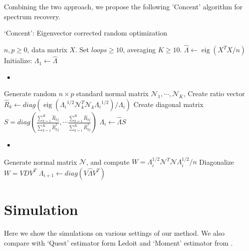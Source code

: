 \documentclass[12pt]{extarticle}
\newcommand{\cN}{{\mathcal{N}}}
\newcommand{\1}{\field{1}}
\DeclareMathOperator*{\eig}{eig}
\numberwithin{equation}{section}
\begin{document}
Combining the two approach, we propose the following 'Concent' algorithm for spectrum recovery.
\begin{algorithm}[H]
\caption{`Concent': Eigenvector corrected random optimization }\label{alg:cap}
\begin{algorithmic}
\Require $n, p \geq 0$, data matrix $X$.
\Require Set  $loops \ge 10$, averaging  $K \ge 10$.
\State $\hat{\Lambda} \gets \eig (X^T X/n)$
\State Initialize: $\Lambda_1 \gets \hat{\Lambda}$
    \begin{itemize}
        \item \; 
    \end{itemize}
    \State Generate random $n\times p$ standard normal matrix  $\cN_1,\cdots, \cN_K$,
        \State  Create ratio vector $\hat{R}_k \gets  diag( \eig({\Lambda_i}^{1/2} \cN_k^T \cN_k {\Lambda_i}^{1/2} ) /{\Lambda_i} )$
    \EndFor
    \State Create diagonal matrix $S = diag (\frac{ \sum_{k=1}^K \hat{R}_{kj}}{\sum_{k=1}^K \hat{R}_{kj}^2 }, \cdots \frac{ \sum_{k=1}^K \hat{R}_{kj}}{\sum_{k=1}^K \hat{R}_{kj}^2 } ) $
    \State $\Lambda_i \gets \hat{\Lambda} S$
    \begin{itemize}
        \item \; 
    \end{itemize}
    \State Generate  normal matrix  $\cN$, and compute $W = \Lambda_i^{1/2} \cN^T \cN \Lambda_i^{1/2} /n $
    \State Diagonalize $W= V D V^T$
    \State $\Lambda_{i+1} \gets diag(V \hat{\Lambda} V^T)$
\EndFor
\end{algorithmic}
\end{algorithm}



\section{Simulation}\label{sec:simulation}
Here we show the simulations on various settings of our method. We also compare with `Quest' estimator form Ledoit \cite{ledoit2015} and `Moment' estimator from \cite{Valiant}.
\end{document}
